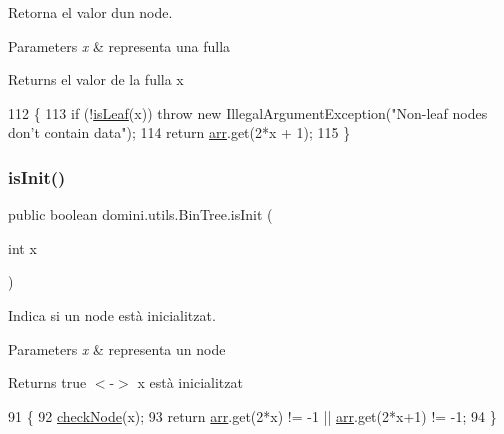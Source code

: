 Retorna el valor d\textquotesingle{}un node. 


\begin{DoxyParams}{Parameters}
{\em x} & representa una fulla \\
\hline
\end{DoxyParams}
\begin{DoxyReturn}{Returns}
el valor de la fulla x 
\end{DoxyReturn}

\begin{DoxyCode}
112                               \{
113         \textcolor{keywordflow}{if} (!\hyperlink{classdomini_1_1utils_1_1BinTree_a37030e961f5613a5c74984ac002d965b}{isLeaf}(x)) \textcolor{keywordflow}{throw} \textcolor{keyword}{new} IllegalArgumentException(\textcolor{stringliteral}{"Non-leaf nodes don't contain data"});
114         \textcolor{keywordflow}{return} \hyperlink{classdomini_1_1utils_1_1BinTree_a357bcbcf07ba7fcb99d11b237d189e65}{arr}.get(2*x + 1);
115     \}
\end{DoxyCode}
\mbox{\label{classdomini_1_1utils_1_1BinTree_aefcc4df5059f9893eba9998cb267eced}} 
\subsubsection{\texorpdfstring{is\+Init()}{isInit()}}
{\footnotesize\ttfamily public boolean domini.\+utils.\+Bin\+Tree.\+is\+Init (\begin{DoxyParamCaption}\item[{int}]{x }\end{DoxyParamCaption})\hspace{0.3cm}{\ttfamily [inline]}}



Indica si un node està inicialitzat. 


\begin{DoxyParams}{Parameters}
{\em x} & representa un node \\
\hline
\end{DoxyParams}
\begin{DoxyReturn}{Returns}
true $<$-\/$>$ x està inicialitzat 
\end{DoxyReturn}

\begin{DoxyCode}
91                                  \{
92         \hyperlink{classdomini_1_1utils_1_1BinTree_a32b3e2ad7dfee3425e0b1f6f8b5100f5}{checkNode}(x);
93         \textcolor{keywordflow}{return} \hyperlink{classdomini_1_1utils_1_1BinTree_a357bcbcf07ba7fcb99d11b237d189e65}{arr}.get(2*x) != -1 || \hyperlink{classdomini_1_1utils_1_1BinTree_a357bcbcf07ba7fcb99d11b237d189e65}{arr}.get(2*x+1) != -1;
94     \}
\end{DoxyCode}
\mbox{\label{classdomini_1_1utils_1_1BinTree_a37030e961f5613a5c74984ac002d965b}} 
